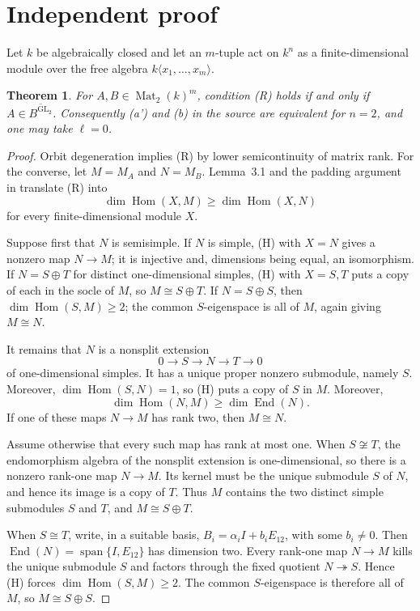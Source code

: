 \documentclass[11pt]{article}
\newtheorem{theorem}{Theorem}
\newcommand{\Mat}{\operatorname{Mat}}
\newcommand{\Hom}{\operatorname{Hom}}
\newcommand{\GL}{\operatorname{GL}}
\begin{document}
\section{Independent proof}
Let $k$ be algebraically closed and let an $m$-tuple act on $k^n$ as a
finite-dimensional module over the free algebra $k\langle x_1,\ldots,x_m\rangle$.

\begin{theorem}
For $A,B\in\Mat_2(k)^m$, condition \emph{(R)} holds if and only if
$A\in\overline{B^{\GL_2}}$.  Consequently (a') and (b) in the source are
equivalent for $n=2$, and one may take $\ell=0$.
\end{theorem}

\begin{proof}
Orbit degeneration implies (R) by lower semicontinuity of matrix rank.  For
the converse, let $M=M_A$ and $N=M_B$.  Lemma~3.1 and the padding argument in
\cite{DKMV} translate (R) into
\[
       \dim\Hom(X,M)\geq\dim\Hom(X,N)                 \tag{H}
\]
for every finite-dimensional module $X$.

Suppose first that $N$ is semisimple.  If $N$ is simple, (H) with $X=N$
gives a nonzero map $N\to M$; it is injective and, dimensions being equal, an
isomorphism.  If $N=S\oplus T$ for distinct one-dimensional simples, (H) with
$X=S,T$ puts a copy of each in the socle of $M$, so $M\cong S\oplus T$.  If
$N=S\oplus S$, then $\dim\Hom(S,M)\geq2$; the common $S$-eigenspace is all of
$M$, again giving $M\cong N$.

It remains that $N$ is a nonsplit extension
\[
             0\longrightarrow S\longrightarrow N\longrightarrow T
             \longrightarrow0                                      \tag{E}
\]
of one-dimensional simples.  It has a unique proper nonzero submodule,
namely $S$.  Moreover, $\dim\Hom(S,N)=1$, so (H) puts a copy of $S$ in $M$.
Moreover,
\[
\dim\Hom(N,M)\geq\dim\operatorname{End}(N).
\]
If one of these maps
$N\to M$ has rank two, then $M\cong N$.

Assume otherwise that every such map has rank at most one.  When $S\not\cong
T$, the endomorphism algebra of the nonsplit extension is one-dimensional,
so there is a nonzero rank-one map $N\to M$.  Its kernel must be the unique
submodule $S$ of $N$, and hence its image is a copy of $T$.  Thus $M$ contains
the two distinct simple submodules $S$ and $T$, and $M\cong S\oplus T$.

When $S\cong T$, write, in a suitable basis,
$B_i=\alpha_iI+b_iE_{12}$, with some $b_i\neq0$.  Then
$\operatorname{End}(N)=\operatorname{span}\{I,E_{12}\}$ has dimension two.
Every rank-one map $N\to M$ kills the unique submodule $S$ and factors through
the fixed quotient $N\twoheadrightarrow S$.  Hence (H) forces
$\dim\Hom(S,M)\geq2$.  The common $S$-eigenspace is therefore all of $M$, so
$M\cong S\oplus S$.


\end{proof}
\end{document}
